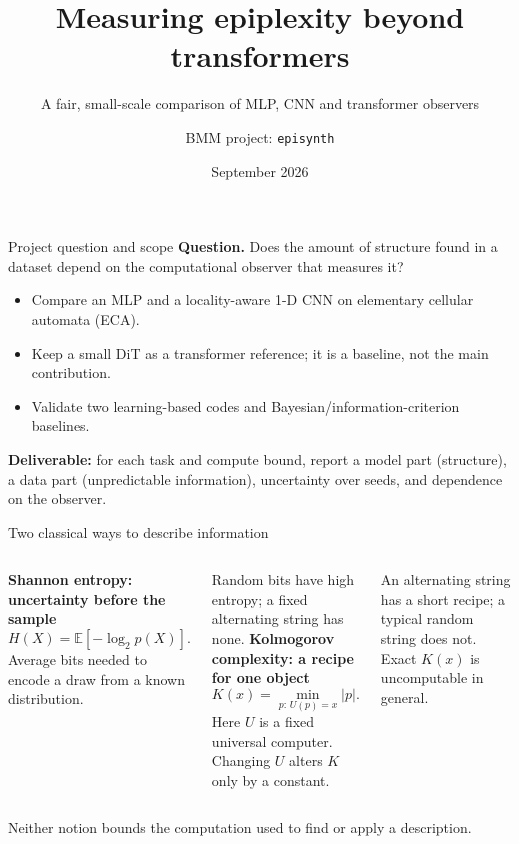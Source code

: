 \documentclass[aspectratio=43]{beamer}
\title{Measuring epiplexity beyond transformers}
\subtitle{A fair, small-scale comparison of MLP, CNN and transformer observers}
\author{BMM project: \texttt{episynth}}
\date{September 2026}
\newcommand{\E}{\mathbb{E}}
\begin{document}
\begin{frame}
\titlepage
\end{frame}

\begin{frame}{Project question and scope}
\textbf{Question.} Does the amount of structure found in a dataset depend on the
computational observer that measures it?

\medskip
\begin{itemize}
\item Compare an MLP and a locality-aware 1-D CNN on elementary cellular automata (ECA).
\item Keep a small DiT as a transformer reference; it is a baseline, not the main contribution.
\item Validate two learning-based codes and Bayesian/information-criterion baselines.
\end{itemize}

\medskip
\textbf{Deliverable:} for each task and compute bound, report a model part (structure),
a data part (unpredictable information), uncertainty over seeds, and dependence on the observer.
\end{frame}

\begin{frame}{Two classical ways to describe information}
\begin{columns}[T]
\textbf{Shannon entropy: uncertainty before the sample}
\[
H(X)=\E[-\log_2 p(X)].
\]
Average bits needed to encode a draw from a known distribution.

\medskip
Random bits have high entropy; a fixed alternating string has none.
\textbf{Kolmogorov complexity: a recipe for one object}
\[
K(x)=\min_{p:\,U(p)=x}|p|.
\]
Here $U$ is a fixed universal computer. Changing $U$ alters $K$ only by a constant.

\medskip
An alternating string has a short recipe; a typical random string does not. Exact $K(x)$ is uncomputable in general.
\end{columns}

\medskip
Neither notion bounds the computation used to find or apply a description.
\end{frame}
\end{document}
